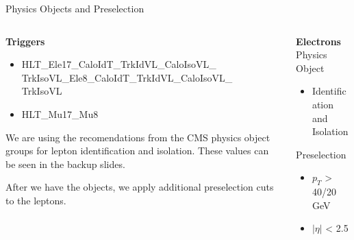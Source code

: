 \begin{frame}{Physics Objects and Preselection}
\begin{columns}
\begin{column}{0.6\textwidth}
   \footnotesize

 {\bf Triggers}\\
  \begin{itemize}
        \item
          HLT\_Ele17\_CaloIdT\_TrkIdVL\_CaloIsoVL\_\\
          TrkIsoVL\_Ele8\_CaloIdT\_TrkIdVL\_CaloIsoVL\_\\
          TrkIsoVL
        \item
          HLT\_Mu17\_Mu8
\end{itemize}

\vspace{2em}
We are using the recomendations from the CMS physics object groups for lepton identification and isolation.  These values can be seen in the backup slides.

\vspace{1em}

After we have the objects, we apply additional preselection cuts to the leptons.

\end{column}


      \begin{column}{0.4\textwidth}
        \footnotesize
        \scriptsize
  {\bf Electrons}\\
  Physics Object
  \begin{itemize}
    \footnotesize
  \item
    Identification and Isolation
    \end{itemize}
  Preselection
  \begin{itemize}
  \item
    $p_{T}$ > 40/20 GeV
  \item
    $|\eta|$ < 2.5
  \end{itemize}


\end{column}
\end{columns}
\end{frame}
